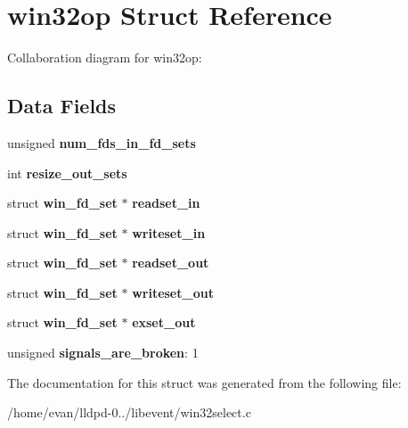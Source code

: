 \section{win32op \-Struct \-Reference}
\label{structwin32op}


\-Collaboration diagram for win32op\-:
\subsection*{\-Data \-Fields}
\begin{DoxyCompactItemize}
\item 
unsigned {\bfseries num\-\_\-fds\-\_\-in\-\_\-fd\-\_\-sets}\label{structwin32op_ab65b2da57249432af1e86141c90d1f80}

\item 
int {\bfseries resize\-\_\-out\-\_\-sets}\label{structwin32op_a914892771eae5611fe3d64240c974d24}

\item 
struct {\bf win\-\_\-fd\-\_\-set} $\ast$ {\bfseries readset\-\_\-in}\label{structwin32op_a7327bd3ccc46b892cc8af4a77466682d}

\item 
struct {\bf win\-\_\-fd\-\_\-set} $\ast$ {\bfseries writeset\-\_\-in}\label{structwin32op_ae5800a0879fbc0639556fb46295294e8}

\item 
struct {\bf win\-\_\-fd\-\_\-set} $\ast$ {\bfseries readset\-\_\-out}\label{structwin32op_a9d259a2d7dea32ecf95b2b37b00cfb3d}

\item 
struct {\bf win\-\_\-fd\-\_\-set} $\ast$ {\bfseries writeset\-\_\-out}\label{structwin32op_a78680f62c954ec88157485bfc0aee873}

\item 
struct {\bf win\-\_\-fd\-\_\-set} $\ast$ {\bfseries exset\-\_\-out}\label{structwin32op_a2cbc98218c698b8a9b3693f88aa8db9a}

\item 
unsigned {\bfseries signals\-\_\-are\-\_\-broken}\-: 1\label{structwin32op_a4bdba94412131aa19120d7215270062f}

\end{DoxyCompactItemize}


\-The documentation for this struct was generated from the following file\-:\begin{DoxyCompactItemize}
\item 
/home/evan/lldpd-\/0../libevent/win32select.\-c\end{DoxyCompactItemize}
